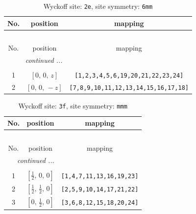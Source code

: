 \documentclass[fleqn,8pt]{jsarticle}
\begin{document}
\begin{longtable}{ccc}
\caption{Wyckoff site: {\tt 2e}, site symmetry: {\tt 6mm}}
 \\
 \hline \hline
No. & position & mapping \\ \hline \endfirsthead

\multicolumn{2}{l}{\tablename\ \thetable{}} \\
 \hline \hline
No. & position & mapping \\ \hline \endhead

 \hline \hline
\multicolumn{2}{r}{\footnotesize\it continued ...} \\ \endfoot

 \hline \hline
\multicolumn{2}{r}{} \\ \endlastfoot

1 & $\left[ 0,\, 0,\, z \right]$ & {\tt [1,2,3,4,5,6,19,20,21,22,23,24]} \\ \hline
2 & $\left[ 0,\, 0,\, - z \right]$ & {\tt [7,8,9,10,11,12,13,14,15,16,17,18]} \\
\end{longtable}
\renewcommand{\arraystretch}{1.2}
\begin{longtable}{ccc}
\caption{Wyckoff site: {\tt 3f}, site symmetry: {\tt mmm}}
 \\
 \hline \hline
No. & position & mapping \\ \hline \endfirsthead

\multicolumn{2}{l}{\tablename\ \thetable{}} \\
 \hline \hline
No. & position & mapping \\ \hline \endhead

 \hline \hline
\multicolumn{2}{r}{\footnotesize\it continued ...} \\ \endfoot

 \hline \hline
\multicolumn{2}{r}{} \\ \endlastfoot

1 & $\left[ \frac{1}{2},\, 0,\, 0 \right]$ & {\tt [1,4,7,11,13,16,19,23]} \\ \hline
2 & $\left[ \frac{1}{2},\, \frac{1}{2},\, 0 \right]$ & {\tt [2,5,9,10,14,17,21,22]} \\ \hline
3 & $\left[ 0,\, \frac{1}{2},\, 0 \right]$ & {\tt [3,6,8,12,15,18,20,24]} \\
\end{longtable}
\renewcommand{\arraystretch}{1.2}
\end{document}
